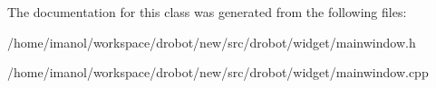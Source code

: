 The documentation for this class was generated from the following files\-:\begin{DoxyCompactItemize}
\item 
/home/imanol/workspace/drobot/new/src/drobot/widget/mainwindow.\-h\item 
/home/imanol/workspace/drobot/new/src/drobot/widget/mainwindow.\-cpp\end{DoxyCompactItemize}
